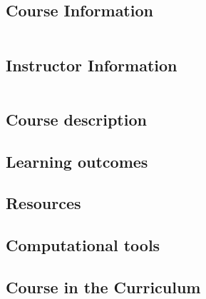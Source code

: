 

 \subsection*{Course Information}
\noindent\parbox{0.5\textwidth}{%
\noindent\begin{tabular}{@{}ll}

\end{tabular}}


\subsection*{Instructor Information}
\noindent\parbox{0.5\textwidth}{%
\noindent\begin{tabular}{@{}ll}

\end{tabular}}

 

 

\subsection*{Course description}





 
\subsection*{Learning outcomes}






\subsection*{Resources}


 \subsection*{Computational tools}








 \subsection*{Course in the Curriculum}









